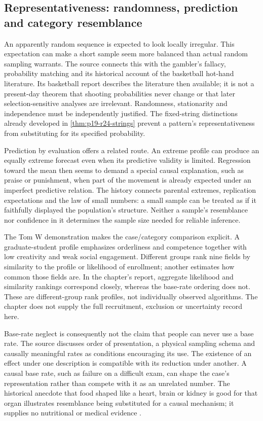 \subsection{Representativeness: randomness, prediction and category resemblance}

An apparently random sequence is expected to look locally irregular.
This expectation can make a short sample seem more balanced than actual
random sampling warrants. The source connects this with the gambler's
fallacy, probability matching and its historical account of the basketball
hot-hand literature. Its basketball report describes the literature then
available; it is not a present-day theorem that shooting probabilities
never change or that later selection-sensitive analyses are irrelevant.
Randomness, stationarity and independence must be independently justified.
The fixed-string distinctions already developed in
\cref{thm:p19-r24-strings} prevent a pattern's representativeness from
substituting for its specified probability.

Prediction by evaluation offers a related route. An extreme profile can
produce an equally extreme forecast even when its predictive validity is
limited. Regression toward the mean then seems to demand a special causal
explanation, such as praise or punishment, when part of the movement is
already expected under an imperfect predictive relation. The history
connects parental extremes, replication expectations and the law of
small numbers: a small sample can be treated as if it faithfully displayed
the population's structure. Neither a sample's resemblance nor confidence
in it determines the sample size needed for reliable inference.

The Tom W demonstration makes the case/category comparison explicit.
A graduate-student profile emphasizes orderliness and competence together
with low creativity and weak social engagement. Different groups rank
nine fields by similarity to the profile or likelihood of enrollment;
another estimates how common those fields are. In the chapter's report,
aggregate likelihood and similarity rankings correspond closely, whereas
the base-rate ordering does not. These are different-group rank profiles,
not individually observed algorithms. The chapter does not supply the
full recruitment, exclusion or uncertainty record here.

Base-rate neglect is consequently not the claim that people can never use
a base rate. The source discusses order of presentation, a physical sampling
schema and causally meaningful rates as conditions encouraging its use.
The existence of an effect under one description is compatible with its
reduction under another. A causal base rate, such as failure on a difficult
exam, can shape the case's representation rather than compete with it as
an unrelated number. The historical anecdote that food shaped like a
heart, brain or kidney is good for that organ illustrates resemblance
being substituted for a causal mechanism; it supplies no nutritional or
medical evidence
\cite[pp.~329, 331--332]{GriffinEtAl2012HeuristicsHistory}.

